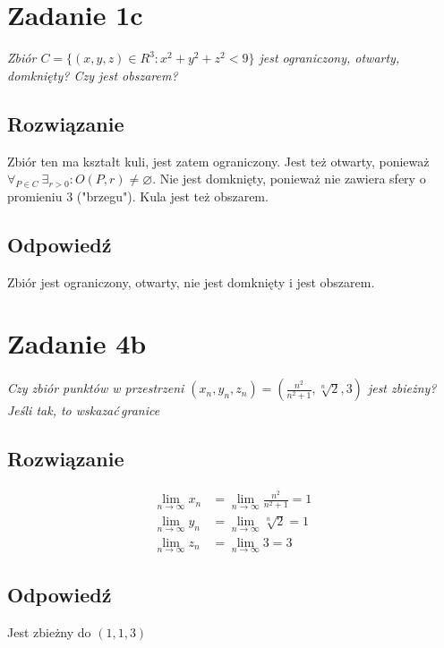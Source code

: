 \documentclass{article}
\newcommand{\task}[1]{\textit{#1}}
\DeclareMathOperator{\?}{?}
\begin{document}
\section*{Zadanie 1c}
\task{Zbiór $C=\{(x,y,z) \in R^3 : x^2 + y^2 + z^2 < 9\}$ jest ograniczony,
otwarty, domknięty? Czy jest obszarem?}

\subsection*{Rozwiązanie}

Zbiór ten ma kształt kuli, jest zatem ograniczony. Jest też otwarty, ponieważ
$ \forall_{P \in C} \ \exists_{r > 0} : O(P, r) \ne \varnothing $. Nie jest
domknięty, ponieważ nie zawiera sfery o promieniu $3$ ("brzegu"). Kula jest też
obszarem.

\subsection*{Odpowiedź}

Zbiór jest ograniczony, otwarty, nie jest domknięty i jest obszarem.

\vspace{3em}

\section*{Zadanie 4b}
\task{Czy zbiór punktów w przestrzeni
$\displaystyle (x_n, y_n, z_n) = \left( \frac{n^2}{n^2 +1}, \sqrt[n]{2}, 3 \right)$
jest zbieżny? Jeśli tak, to wskazać\,granice}

\subsection*{Rozwiązanie}

\begin{align*}
   \lim_{n \to \infty} x_n &= \lim_{n \to \infty} \frac{n^2}{n^2 + 1} = 1 \\
   \lim_{n \to \infty} y_n &= \lim_{n \to \infty} \sqrt[n]{2}         = 1 \\
   \lim_{n \to \infty} z_n &= \lim_{n \to \infty} 3                   = 3
\end{align*}

\subsection*{Odpowiedź}

Jest zbieżny do $(1,1,3)$

\vspace{3em}
\end{document}

